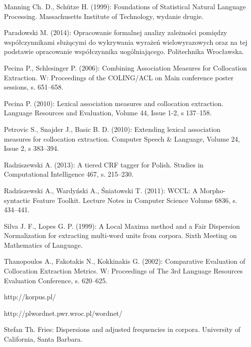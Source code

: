 \documentclass[11pt,a4paper]{llncs}
\begin{document}
\begin{thebibliography}{4}
 Manning Ch. D., Schütze H. (1999): Foundations of Statistical Natural Language Processing.
	Massachusetts Institute of Technology, 
	wydanie drugie.

	Paradowski M. (2014): Opracowanie formalnej analizy zależności pomiędzy współczynnikami służącymi do wykrywania wyrażeń wielowyrazowych oraz na tej podstawie opracowanie współczynnika uogólniającego. Politechnika Wrocławska.

  	Pecina P., Schlesinger P. (2006): Combining Association Measures for Collocation Extraction. W: Proceedings of the COLING/ACL on Main conference poster sessions, s. 651--658.
  
Pecina P. (2010): Lexical association measures and collocation extraction. Language Resources and Evaluation, Volume 44, Issue 1-2, s 137--158.


	Petrovic S., Snajder J., Basic B. D. (2010): Extending lexical association measures for collocation extraction. Computer Speech \& Language, Volume 24, Issue 2, s 383--394.

	
 Radziszewski A. (2013): A tiered CRF tagger for Polish. Studies in Computational Intelligence 467, s. 215--230.

	 
	Radziszewski A., Wardyński A., Śniatowski T. (2011): WCCL: A Morpho-syntactic Feature Toolkit. Lecture Notes in Computer Science Volume 6836, s. 434--441.
	
	Silva J. F., Lopes G. P. (1999): A Local Maxima method and a Fair Dispersion Normalization for extracting multi-word units from corpora.
	Sixth Meeting on Mathematics of Language.

		
	Thanopoulos A., Fakotakis N., Kokkinakis G. (2002): Comparative Evaluation of Collocation Extraction Metrics.
	W: Proceedings of The 3rd Language Resources Evaluation Conference, s. 620--625.
	

 http://korpus.pl/

	http://plwordnet.pwr.wroc.pl/wordnet/
	
	Stefan Th. Fries: Dispersions and adjusted frequencies in corpora.
	University of California, Santa Barbara.


\end{thebibliography}
\end{document}
